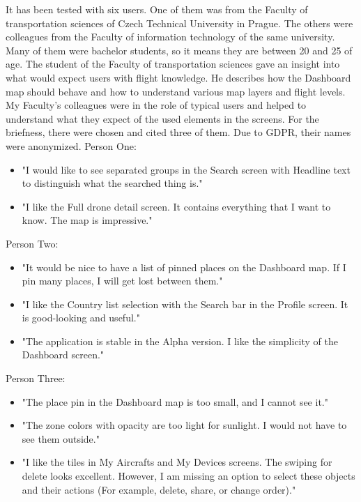 It has been tested with six users.
One of them was from the Faculty of transportation sciences of Czech Technical University in Prague.
The others were colleagues from the Faculty of information technology of the same university.
Many of them were bachelor students, so it means they are between 20 and 25 of age.
The student of the Faculty of transportation sciences gave an insight into what would expect users with flight knowledge.
He describes how the Dashboard map should behave and how to understand various map layers and flight levels.
My Faculty’s colleagues were in the role of typical users and helped to understand what they expect of the used elements in the screens.
For the briefness, there were chosen and cited three of them.
Due to GDPR, their names were anonymized.
\newline
\newline
Person One:
\begin{itemize}
    \item "I would like to see separated groups in the Search screen with Headline text to distinguish what the searched thing is."
    \item "I like the Full drone detail screen.
    It contains everything that I want to know.
    The map is impressive."
\end{itemize}
Person Two:
\begin{itemize}
    \item "It would be nice to have a list of pinned places on the Dashboard map.
    If I pin many places, I will get lost between them."
    \item "I like the Country list selection with the Search bar in the Profile screen.
    It is good-looking and useful."
    \item "The application is stable in the Alpha version.
    I like the simplicity of the Dashboard screen."
\end{itemize}
Person Three:
\begin{itemize}
    \item "The place pin in the Dashboard map is too small, and I cannot see it."
    \item "The zone colors with opacity are too light for sunlight.
    I would not have to see them outside."
    \item "I like the tiles in My Aircrafts and My Devices screens.
    The swiping for delete looks excellent.
    However, I am missing an option to select these objects and their actions (For example, delete, share, or change order)."
\end{itemize}



